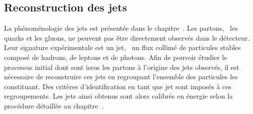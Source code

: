 \subsection{Reconstruction des jets}\label{chapter-CMS-section-jets_reco}
La phénoménologie des jets est présentée dans le chapitre~.
Les partons, \ie\ les quarks et les gluons, ne peuvent pas être directement observés dans le détecteur.
Leur signature expérimentale est un jet, \ie\ un flux collimé de particules stables composé de hadrons, de leptons et de photons.
Afin de pouvoir étudier le processus initial dont sont issus les partons à l'origine des jets observés, il est nécessaire de reconstruire ces jets en regroupant l'ensemble des particules les constituant.
Des critères d'identification en tant que jet sont imposés à ces regroupements.
Les jets ainsi obtenus sont alors calibrés en énergie selon la procédure détaillée au chapitre~.	

